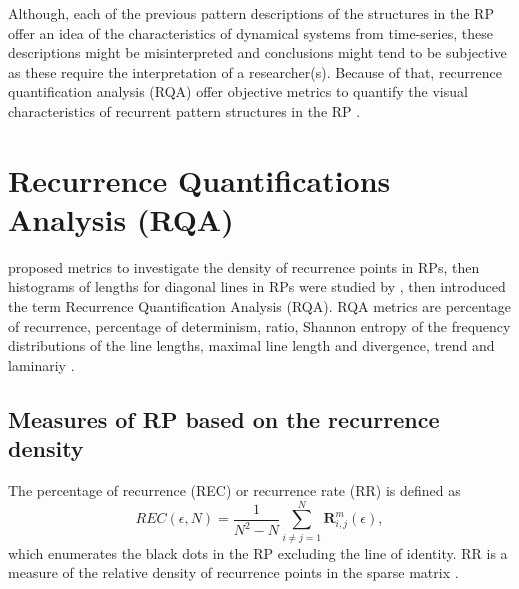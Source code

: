 Although, each of the previous pattern descriptions of the structures in the 
RP offer an idea of the characteristics of dynamical systems from 
time-series, these descriptions might be misinterpreted and conclusions might 
tend to be subjective as these require the interpretation of a researcher(s).
Because of that, recurrence quantification analysis (RQA) offer objective
metrics to quantify the visual characteristics of recurrent 
pattern structures in the RP \citep{zbilut1992}.


\section{Recurrence Quantifications Analysis (RQA)} \label{sec:rqa}
\cite{zbilut1992} proposed metrics to investigate the density of recurrence 
points in RPs, then histograms of lengths for diagonal lines in RPs were 
studied by \cite{trulla1996}, then \cite{marwan2008} introduced the term 
Recurrence Quantification Analysis (RQA). RQA metrics are percentage 
of recurrence, percentage of determinism, ratio, Shannon entropy of the 
frequency distributions of the line lengths, maximal line length and 
divergence, trend and laminariy \citep{marwan2007, marwan2015}.


\subsection{Measures of RP based on the recurrence density}
The percentage of recurrence (REC) or recurrence rate (RR) is defined as
\begin{equation}
	REC(\epsilon,N)= 
	\frac{1}{N^2 - N} \sum^{N}_{i \neq j = 1} 
	\mathbf{R}^{m}_{i,j}(\epsilon),
\end{equation}
which enumerates the black dots in the RP excluding the line of identity.
RR is a measure of the relative density of recurrence points in the sparse 
matrix \citep{marwan2015}.


